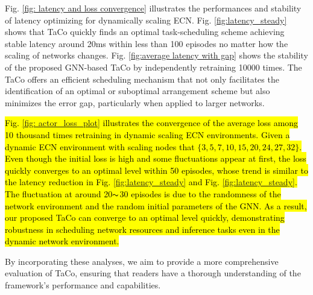 \documentclass{ar2rc}
\newcommand{\highlight}[1]{\sethlcolor{yellow!50}\hl{#1}}
\begin{document}
Fig. \ref{fig: latency and loss convergence} illustrates the performances and stability of latency optimizing for dynamically scaling ECN. Fig. \ref{fig:latency_steady} shows that TaCo quickly finds an optimal task-scheduling scheme achieving stable latency around 20ms within less than 100 episodes no matter how the scaling of networks changes. Fig. \ref{fig:average latency with gap} shows the stability of the proposed GNN-based TaCo by independently retraining 10000 times. The TaCo offers an efficient scheduling mechanism that not only facilitates the identification of an optimal or suboptimal arrangement scheme but also minimizes the error gap, particularly when applied to larger networks. 

\highlight{Fig. \ref{fig: actor_loss_plot} illustrates the convergence of the average loss among 10 thousand times retraining in dynamic scaling ECN environments. Given a dynamic ECN environment with scaling nodes that $\{3, 5, 7, 10, 15, 20, 24, 27, 32\}$. Even though the initial loss is high and some fluctuations appear at first, the loss quickly converges to an optimal level within 50 episodes, whose trend is similar to the latency reduction in Fig. \ref{fig:latency_steady} and Fig. \ref{fig:latency_steady}. The fluctuation at around 20$\thicksim$30 episodes is due to the randomness of the network environment and the random initial parameters of the GNN. As a result, our proposed TaCo can converge to an optimal level quickly, demonstrating robustness in scheduling network resources and inference tasks even in the dynamic network environment.}

By incorporating these analyses, we aim to provide a more comprehensive evaluation of TaCo, ensuring that readers have a thorough understanding of the framework's performance and capabilities.


% 
% 
\end{document}

